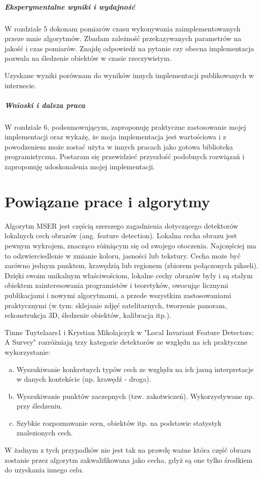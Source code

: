 \subparagraph{Eksperymentalne wyniki i wydajność}

W rozdziale 5 dokonam pomiarów czasu wykonywania zaimplementowanych przeze mnie
algorytmów. Zbadam zależność przekazywanych parametrów na jakość i czas
pomiarów. Znajdę odpowiedź na pytanie czy obecna implementacja pozwala na
śledzenie obiektów w czasie rzeczywistym.

Uzyskane wyniki porównam do wyników innych implementacji publikowanych w
internecie.

\subparagraph{Wnioski i dalsza praca}

W rozdziale 6, podsumowującym, zaproponuję praktyczne zastosowanie mojej
implementacji oraz wykażę, że moja implementacja jest wartościowa i z
powodzeniem może zostać użyta w innych pracach jako gotowa biblioteka
programistyczna. Postaram się przewidzieć przyszłość podobnych rozwiązań i
zaproponuję udoskonalenia mojej implementacji.

\section{Powiązane prace i algorytmy}

Algorytm MSER jest częścią szerszego zagadnienia dotyczącego detektorów
lokalnych cech obrazów (ang. feature detection). Lokalna cecha obrazu jest
pewnym wykrojem, znacząco różniącym się od swojego otoczenia.  Najczęściej ma
to odzwierciedlenie w zmianie koloru, jasności lub tekstury.  Cecha może być
zarówno jednym punktem, krawędzią lub regionem (zbiorem połączonych pikseli).
Dzięki swoim unikalnym właściwościom, lokalne cechy obrazów były i są stałym
obiektem zainteresowania programistów i teoretyków, owocując licznymi
publikacjami i nowymi algorytmami, a przede wszystkim zastosowaniami
praktycznymi (w tym: sklejanie zdjęć satelitarnych, tworzenie panoram,
rekonstrukcja 3D, śledzenie obiektów, kalibracja itp.).

Tinne Tuytelaars1 i Krystian Mikolajczyk w "Local Invariant Feature Detectors:
A Survey" \cite{survey} rozróżniają trzy kategorie detektorów ze względu na
ich praktyczne wykorzystanie: \begin{enumerate}[a)] \item Wyszukiwanie
konkretnych typów cech ze względu na ich jasną interpretacje w danych
kontekście (np. krawędź - droga). \item Wyszukiwanie punktów zaczepnych (tzw.
zakotwiczeń). Wykorzystywane np. przy śledzeniu. \item Szybkie rozpoznawanie
scen, obiektów itp. na podstawie statystyk znalezionych cech. \end{enumerate} W
żadnym z tych przypadków nie jest tak na prawdę ważne która część obrazu
zostanie przez algorytm zakwalifikowana jako cecha, gdyż są one tylko środkiem
do uzyskania innego celu.


